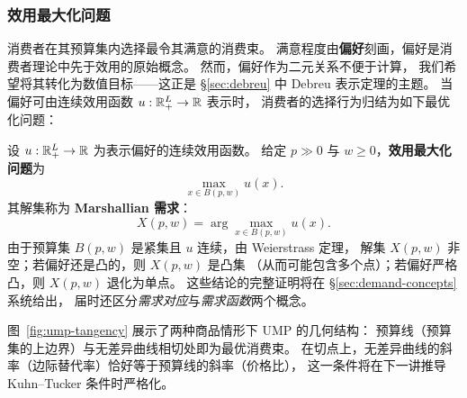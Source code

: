 \subsubsection{效用最大化问题}
\label{subsec:ump}

消费者在其预算集内选择最令其满意的消费束。
满意程度由\textbf{偏好}刻画，偏好是消费者理论中先于效用的原始概念。
然而，偏好作为二元关系不便于计算，
我们希望将其转化为数值目标——这正是 \S\ref{sec:debreu}
中 Debreu 表示定理的主题。
当偏好可由连续效用函数 $u:\mathbb{R}^L_+\to\mathbb{R}$ 表示时，
消费者的选择行为归结为如下最优化问题：

\begin{definition}\label{def:ump}
设 $u:\mathbb{R}^L_+\to\mathbb{R}$ 为表示偏好的连续效用函数。
给定 $p\gg 0$ 与 $w\geq 0$，\textbf{效用最大化问题}为
\begin{equation}\label{eq:ump}
  \max_{x\in B(p,w)} u(x).
\end{equation}
其解集称为 \textbf{Marshallian 需求}：
\[
  X(p,w)=\arg\max_{x\in B(p,w)} u(x).
\]
由于预算集 $B(p,w)$ 是紧集且 $u$ 连续，由 Weierstrass 定理，
解集 $X(p,w)$ 非空；若偏好还是凸的，则 $X(p,w)$ 是凸集
（从而可能包含多个点）；若偏好严格凸，则 $X(p,w)$ 退化为单点。
这些结论的完整证明将在 \S\ref{sec:demand-concepts} 系统给出，
届时还区分\emph{需求对应}与\emph{需求函数}两个概念。
\end{definition}

图~\ref{fig:ump-tangency} 展示了两种商品情形下 UMP 的几何结构：
预算线（预算集的上边界）与无差异曲线相切处即为最优消费束。
在切点上，无差异曲线的斜率（边际替代率）恰好等于预算线的斜率（价格比），
这一条件将在下一讲推导 Kuhn--Tucker 条件时严格化。

